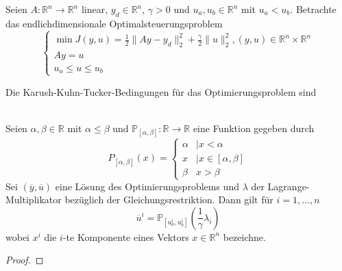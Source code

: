 
Seien $A: \mathbb R^n\to \mathbb R^n$ linear, $y_d\in\mathbb R^n$, $\gamma>0$ und $u_a,u_b\in\mathbb R^n$ mit $u_a<u_b$. Betrachte das endlichdimensionale Optimalsteuerungsproblem
$$\begin{cases}\min J(y,u)=\frac{1}{2}\|Ay-y_d\|_2^2+\frac{\gamma}{2}\|u\|_2^2, (y,u)\in\mathbb R^n\times \mathbb R^n\\Ay=u\\u_a\leq u\leq u_b\end{cases}$$
\begin{compactenum}[(i)]
\item Die Karush-Kuhn-Tucker-Bedingungen für das Optimierungsproblem sind\\\\
\item Seien $\alpha,\beta\in\mathbb R$ mit $\alpha\leq\beta$ und $\mathbb P_{[\alpha,\beta]}:\mathbb R\to\mathbb R$ eine Funktion gegeben durch $$P_{[\alpha,\beta]}(x)=\begin{cases}\alpha&\mid x<\alpha\\x&\mid x\in[\alpha,\beta]\\\beta&x>\beta\end{cases}$$
Sei $(\overline y,\overline u)$ eine Lösung des Optimierungsproblems und $\lambda$ der Lagrange-Multiplikator bezüglich der Gleichungsrestriktion. Dann gilt für $i=1,...,n$
$$\overline u^i = \mathbb P_{[u_a^i,u_b^i]}(\frac{1}{\gamma}\lambda_i)$$
wobei $x^i$ die $i$-te Komponente eines Vektors $x\in\mathbb R^n$ bezeichne. 
\begin{proof}
\end{proof}
\end{compactenum}
